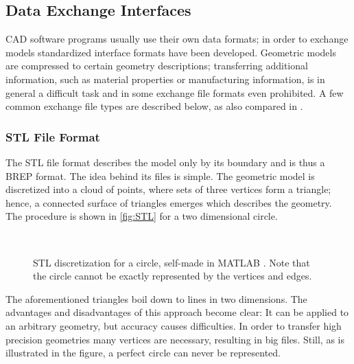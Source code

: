 \subsection{Data Exchange Interfaces}
\ac{CAD} software programs usually use their own data formats; in order to exchange models standardized interface formats have been developed. Geometric models are compressed to certain geometry descriptions; transferring additional information, such as material properties or manufacturing information, is in general a difficult task and in some exchange file formats even prohibited. A few common exchange file types are described below, as also compared in \cite{STL}.
\subsubsection{\acs{STL} File Format} \label{subsub:STL}
The \acf{STL} file format describes the model only by its boundary and is thus a \ac{BREP} format. The idea behind its files is simple. The geometric model is discretized into a cloud of points, where sets of three vertices form a triangle; hence, a connected surface of triangles emerges which describes the geometry. The procedure is shown in \autoref{fig:STL} for a two dimensional circle.  
\begin{figure}
\centering
   \\
   \caption{\ac{STL} discretization for a circle, self-made in MATLAB \cite{MATLAB}. Note that the circle cannot be exactly represented by the vertices and edges.}
   \label{fig:STL}
\end{figure}
The aforementioned triangles boil down to lines in two dimensions. The advantages and disadvantages of this approach become clear: It can be applied to an arbitrary geometry, but accuracy causes difficulties. In order to transfer high precision geometries many vertices are necessary, resulting in big files. Still, as is illustrated in the figure, a perfect circle can never be represented. 

